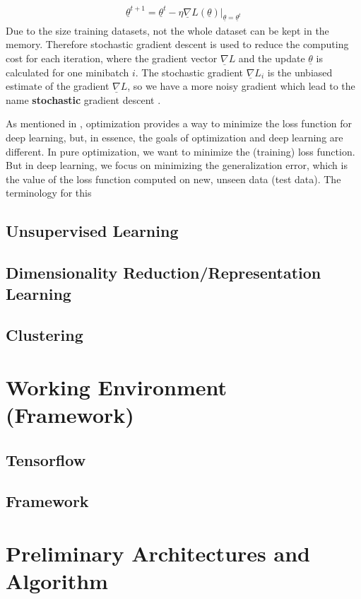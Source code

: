 \documentclass[12pt,DIV14,BCOR12mm,a4paper,footexclude,headinclude,halfparskip-,twoside,openright,openany,cleardoubleempty,idxtotoc,bibtotoc]{scrreprt} %
\numberwithin{equation}{chapter}
\begin{document}
\begin{align}
	\underline{\theta}^{t+1} = \underline{\theta}^{t} - \eta\underline{\nabla}L(\underline{\theta})|_{\underline{\theta}=\underline{\theta}^{t}}\label{eq:GradientDescent_update}
\end{align}
Due to the size training datasets, not the whole dataset can be kept in the memory. Therefore stochastic gradient descent is used to reduce the computing cost for each iteration, where the gradient vector $\underline{\nabla}L$ and the update $\underline{\theta}$ is calculated for one minibatch $i$. The stochastic gradient $\underline{\nabla}L_{i}$ is the unbiased estimate of the gradient $\underline{\nabla}L$, so we have a more noisy gradient which lead to the name \textbf{stochastic} gradient descent \cite{DeepLearningDive}.

As mentioned in \cite{DeepLearningDive}, optimization provides a way to minimize the loss function for deep learning, but, in essence, the goals of optimization and deep learning are different. In pure optimization, we want to minimize the (training) loss function. But in deep learning, we focus on minimizing the generalization error, which is the value of the loss function computed on new, unseen data (test data). The terminology for this 
\section{Unsupervised Learning}
\section{Dimensionality Reduction/Representation Learning}
\section{Clustering}
\chapter{Working Environment (Framework)}
\section{Tensorflow}
\section{Framework}
\chapter{Preliminary Architectures and Algorithm}
\end{document}

